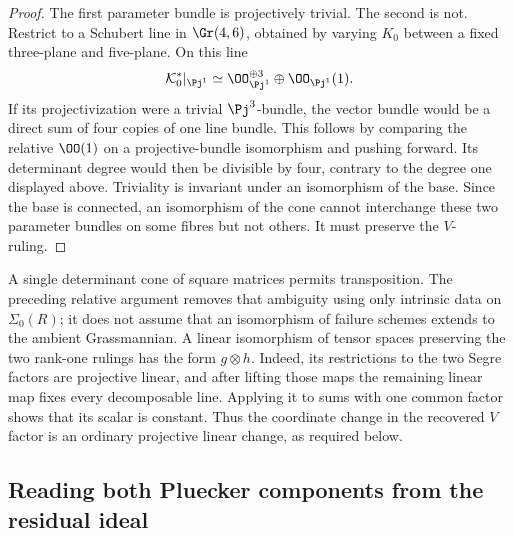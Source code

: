 \begin{proof}
The first parameter bundle is projectively trivial.  The second is
not.  Restrict to a Schubert line in \(\Gr(4,6)\), obtained by
varying \(K_0\) between a fixed three-plane and five-plane.  On
this line
\[
 \mathcal K_0^*|_{\Pj^1}\simeq
 \OO_{\Pj^1}^{\oplus3}\oplus\OO_{\Pj^1}(1).
\]
If its projectivization were a trivial \(\Pj^3\)-bundle, the
vector bundle would be a direct sum of four copies of one line
bundle.  This follows by comparing the relative \(\OO(1)\)
on a projective-bundle isomorphism and pushing forward.  Its
determinant degree would then be divisible by four, contrary to the
degree one displayed above.  Triviality is invariant under an
isomorphism of the base.  Since the base is connected, an isomorphism
of the cone cannot interchange these two parameter bundles on some
fibres but not others.  It must preserve the \(V\)-ruling.
\end{proof}

\begin{remark}
A single determinant cone of square matrices permits transposition.
The preceding relative argument removes that ambiguity using only
intrinsic data on \(\Sigma_0(R)\); it does not assume that an
isomorphism of failure schemes extends to the ambient Grassmannian.
A linear isomorphism of tensor spaces preserving the two rank-one
rulings has the form \(g\otimes h\).  Indeed, its restrictions
to the two Segre factors are projective linear, and after lifting
those maps the remaining linear map fixes every decomposable line.
Applying it to sums with one common factor shows that its scalar is
constant.  Thus the coordinate change in the recovered \(V\)
factor is an ordinary projective linear change, as required below.
\end{remark}



\subsection{Reading both Pluecker components from the residual ideal}

